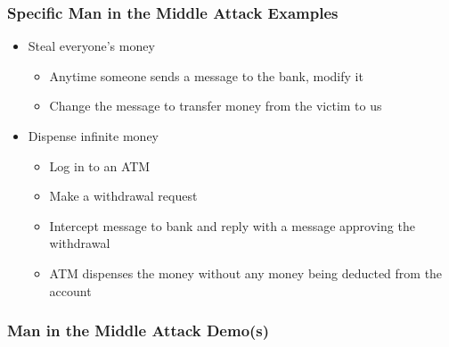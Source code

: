 \documentclass{beamer}
\begin{document}
\begin{frame}[fragile]
\frametitle{Specific Man in the Middle Attack Examples}
\begin{itemize}
\item Steal everyone's money
\begin{itemize}
\item Anytime someone sends a message to the bank, modify it
\item Change the message to transfer money from the victim to us
\end{itemize}
\item Dispense infinite money
\begin{itemize}
\item Log in to an ATM
\item Make a withdrawal request
\item Intercept message to bank and reply with a message approving the withdrawal
\item ATM dispenses the money without any money being deducted from the account
\end{itemize}
\end{itemize}
\end{frame}

\begin{frame}[fragile]
\frametitle{Man in the Middle Attack Demo(s)}
\end{frame}
\end{document}
